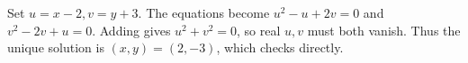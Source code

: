Set $u=x-2,v=y+3$. The equations become $u^2-u+2v=0$ and $v^2-2v+u=0$. Adding gives $u^2+v^2=0$, so real $u,v$ must both vanish. Thus the unique solution is $\boxed{(x,y)=(2,-3)}$, which checks directly.
